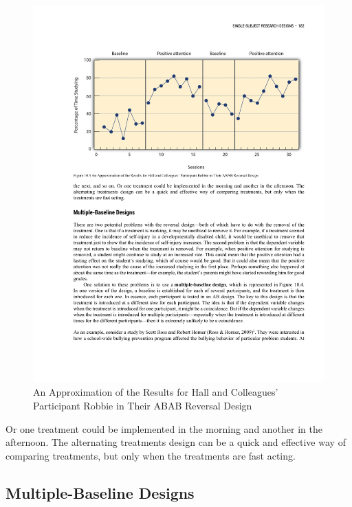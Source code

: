 \begin{figure}




\includegraphics[width=\linewidth]{figures/C10alternating.pdf}




\caption{An Approximation of the Results for Hall and Colleagues' Participant Robbie in Their ABAB Reversal Design}




\label{fig:alternating}




\end{figure}


Or one treatment could be implemented in the morning and another in the afternoon. The alternating treatments design can be a quick and effective way of comparing treatments, but only when the treatments are fast acting.

\subsection{Multiple-Baseline Designs}

